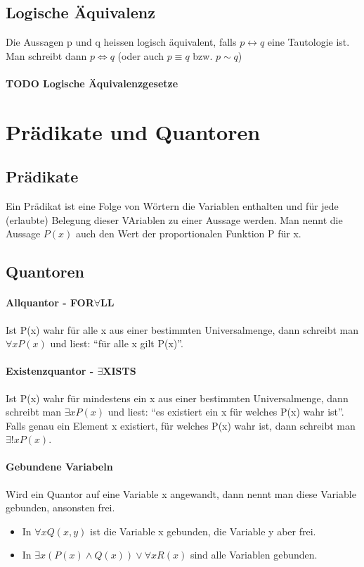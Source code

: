 \documentclass[12pt,a4paper]{article}
\begin{document}
\subsection{Logische Äquivalenz}Die Aussagen p und q heissen logisch äquivalent, falls $p \leftrightarrow q$ eine Tautologie ist. Man schreibt dann $p \Leftrightarrow q$ (oder auch $p \equiv q$ bzw. $p \sim q$)
\paragraph{TODO Logische Äquivalenzgesetze}

\section{Prädikate und Quantoren}
\subsection{Prädikate}Ein Prädikat ist eine Folge von Wörtern die Variablen enthalten und für jede (erlaubte) Belegung dieser VAriablen zu einer Aussage werden. Man nennt die Aussage $P(x)$ auch den Wert der proportionalen Funktion P für x.

\subsection{Quantoren}
\paragraph{Allquantor - FOR$\forall$LL}Ist P(x) wahr für alle x aus einer bestimmten Universalmenge, dann schreibt man $\forall x P(x)$ und liest: "`für alle x gilt P(x)"'.
\paragraph{Existenzquantor - $\exists$XISTS}Ist P(x) wahr für mindestens ein x aus einer bestimmten Universalmenge, dann schreibt man $\exists x P(x)$ und liest: "`es existiert ein x für welches P(x) wahr ist"'. Falls genau ein Element x existiert, für welches P(x) wahr ist, dann schreibt man $\exists !xP(x)$.
\paragraph{Gebundene Variabeln}Wird ein Quantor auf eine Variable x angewandt, dann nennt man diese Variable gebunden, ansonsten frei.
\begin{itemize}[noitemsep,topsep=0pt,leftmargin=*]
    \item In  $\forall xQ(x,y)$ ist die Variable x gebunden, die Variable y aber frei.
    \item In $\exists x(P(x) \wedge Q(x)) \vee \forall xR(x)$ sind alle Variablen gebunden.
\end{itemize}
\end{document}
